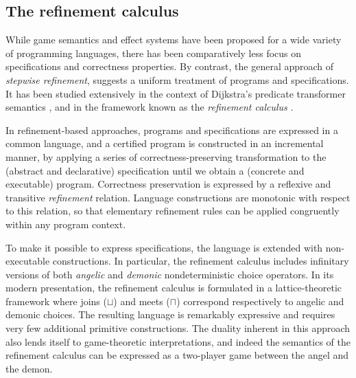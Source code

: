 \documentclass[11pt,oneside]{book}
\theoremstyle{definition}
\begin{document}


\subsection{The refinement calculus} %

While game semantics
and effect systems
have been proposed
for a wide variety of programming languages,
there has been comparatively less focus
on specifications and correctness properties.
By contrast,
the general approach of \emph{stepwise refinement},
suggests a uniform treatment of programs and specifications.
It has been studied extensively in the context of
Dijkstra's predicate transformer semantics \citep{gc}, and
in the framework known as the \emph{refinement calculus} \citep{refcal}.

In refinement-based approaches,
programs and specifications are expressed in a common language,
and a certified program is constructed in an incremental manner,
by applying a series of correctness-preserving transformation
to the (abstract and declarative) specification
until we obtain a (concrete and executable) program.
Correctness preservation is expressed
by a reflexive and transitive \emph{refinement} relation.
Language constructions are monotonic with respect to this relation,
so that elementary refinement rules
can be applied congruently within any program context.

To make it possible to express specifications,
the language is extended with non-executable constructions.
In particular,
the refinement calculus includes infinitary versions of both
\emph{angelic} and \emph{demonic} nondeterministic choice operators.
In its modern presentation,
the refinement calculus is formulated in a lattice-theoretic framework
where joins ($\sqcup$) and meets ($\sqcap$)
correspond respectively to angelic and demonic choices.
The resulting language is remarkably expressive
and requires very few additional primitive constructions.
The duality inherent in this approach
also lends itself to game-theoretic interpretations,
and indeed the semantics of the refinement calculus
can be expressed as a two-player game between
the angel and the demon.

%
\end{document}
